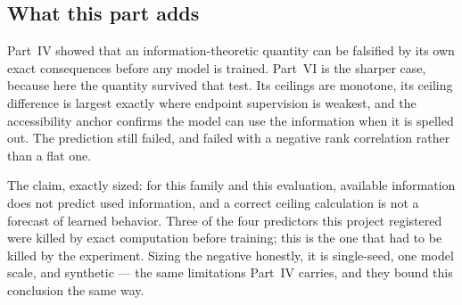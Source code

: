 \subsection{What this part adds}

Part~IV showed that an information-theoretic quantity can be falsified by its own exact consequences before any model is trained. Part~VI is the sharper case, because here the quantity survived that test. Its ceilings are monotone, its ceiling difference is largest exactly where endpoint supervision is weakest, and the accessibility anchor confirms the model can use the information when it is spelled out. The prediction still failed, and failed with a negative rank correlation rather than a flat one.

The claim, exactly sized: for this family and this evaluation, available information does not predict used information, and a correct ceiling calculation is not a forecast of learned behavior. Three of the four predictors this project registered were killed by exact computation before training; this is the one that had to be killed by the experiment. Sizing the negative honestly, it is single-seed, one model scale, and synthetic --- the same limitations Part~IV carries, and they bound this conclusion the same way.
